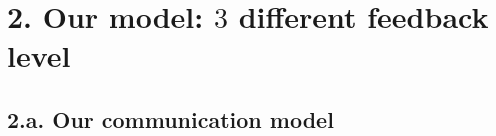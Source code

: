 \documentclass[12pt,english,ignorenonframetext,aspectratio=169,]{beamer}
\providecommand{\tightlist}{%
  \setlength{\itemsep}{0pt}\setlength{\parskip}{0pt}}
\begin{document}







\section{\hfill{}2. Our model: $3$ different feedback level\hfill{}}

\subsection{\hfill{}2.a. Our communication model\hfill{}}
\end{document}
